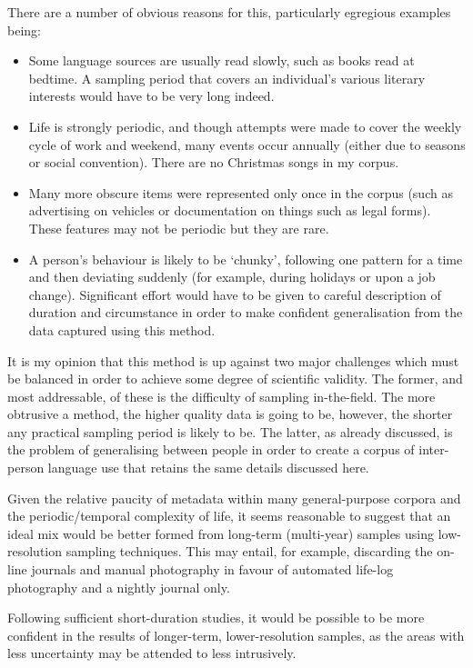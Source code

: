 There are a number of obvious reasons for this, particularly egregious examples being:

\begin{itemize}
    \item Some language sources are usually read slowly, such as books read at bedtime.  A sampling period that covers an individual's various literary interests would have to be very long indeed.
    \item Life is strongly periodic, and though attempts were made to cover the weekly cycle of work and weekend, many events occur annually (either due to seasons or social convention).  There are no Christmas songs in my corpus.
    \item Many more obscure items were represented only once in the corpus (such as advertising on vehicles or documentation on things such as legal forms).  These features may not be periodic but they are rare.
    \item A person's behaviour is likely to be `chunky', following one pattern for a time and then deviating suddenly (for example, during holidays or upon a job change).  Significant effort would have to be given to careful description of duration and circumstance in order to make confident generalisation from the data captured using this method.
\end{itemize}

It is my opinion that this method is up against two major challenges which must be balanced in order to achieve some degree of scientific validity.  The former, and most addressable, of these is the difficulty of sampling in-the-field.  The more obtrusive a method, the higher quality data is going to be, however, the shorter any practical sampling period is likely to be.  The latter, as already discussed, is the problem of generalising between people in order to create a corpus of inter-person language use that retains the same details discussed here.

Given the relative paucity of metadata within many general-purpose corpora and the periodic/temporal complexity of life, it seems reasonable to suggest that an ideal mix would be better formed from long-term (multi-year) samples using low-resolution sampling techniques.  This may entail, for example, discarding the on-line journals and manual photography in favour of automated life-log photography and a nightly journal only.

Following sufficient short-duration studies, it would be possible to be more confident in the results of longer-term, lower-resolution samples, as the areas with less uncertainty may be attended to less intrusively.








